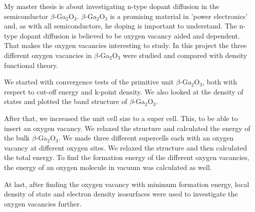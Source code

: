My master thesis is about investigating n-type dopant diffusion in the semiconductor $\beta$-Ga$_2$O$_3$. $\beta$-Ga$_2$O$_3$ is a promising material in 'power electronics' \cite{} and, as with all semiconductors, he doping is important to understand. The n-type dopant diffusion is believed to be oxygen vacancy aided and dependent. That makes the oxygen vacancies interesting to study. In this project the three different oxygen vacancies in $\beta$-Ga$_2$O$_3$ were studied and compared with density functional theory.

We started with convergence tests of the primitive unit $\beta$-Ga$_2$O$_3$, both with respect to cut-off energy and k-point density. We also looked at the density of states and plotted the band structure of $\beta$-Ga$_2$O$_3$.

After that, we increased the unit cell size to a super cell. This, to be able to insert an oxygen vacancy. We relaxed the structure and calculated the energy of the bulk $\beta$-Ga$_2$O$_3$. We made three different supercells each with an oxygen vacancy at different oxygen sites. We relaxed the structure and then calculated the total energy. To find the formation energy of the different oxygen vacancies, the energy of an oxygen molecule in vacuum was calculated as well. 

At last, after finding the oxygen vacancy with minimum formation energy, local density of state and electron density isosurfaces were used to investigate the oxygen vacancies further. 
